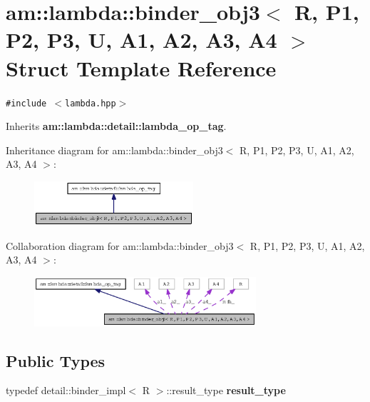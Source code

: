 \section{am::lambda::binder\_\-obj3$<$ R, P1, P2, P3, U, A1, A2, A3, A4 $>$ Struct Template Reference}
\label{structam_1_1lambda_1_1binder__obj3}
{\tt \#include $<$lambda.hpp$>$}

Inherits {\bf am::lambda::detail::lambda\_\-op\_\-tag}.

Inheritance diagram for am::lambda::binder\_\-obj3$<$ R, P1, P2, P3, U, A1, A2, A3, A4 $>$:\begin{figure}[H]
\begin{center}
\leavevmode
\includegraphics[width=167pt]{structam_1_1lambda_1_1binder__obj3__inherit__graph}
\end{center}
\end{figure}
Collaboration diagram for am::lambda::binder\_\-obj3$<$ R, P1, P2, P3, U, A1, A2, A3, A4 $>$:\begin{figure}[H]
\begin{center}
\leavevmode
\includegraphics[width=233pt]{structam_1_1lambda_1_1binder__obj3__coll__graph}
\end{center}
\end{figure}
\subsection*{Public Types}
\begin{CompactItemize}
\item 
typedef detail::binder\_\-impl$<$ R $>$::result\_\-type \textbf{result\_\-type}\label{structam_1_1lambda_1_1binder__obj3_5c3870ec9614f57a734bd9f577cfdf30}

\end{CompactItemize}
